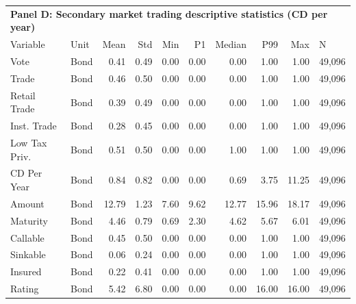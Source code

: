 \begin{table}[H]
\centering
\begin{tabular*}{\textwidth}{@{\extracolsep{\fill}}llrrrrrrrl}
\multicolumn{10}{l}{\textbf{Panel D: Secondary market trading descriptive statistics (CD per year)}}\\

\addlinespace
  \toprule
Variable & Unit & Mean & Std & Min & P1 & Median & P99 & Max & N \\ 
  \hline
Vote & Bond & 0.41 & 0.49 & 0.00 & 0.00 & 0.00 & 1.00 & 1.00 & 49,096 \\ 
  Trade & Bond & 0.46 & 0.50 & 0.00 & 0.00 & 0.00 & 1.00 & 1.00 & 49,096 \\ 
  Retail Trade & Bond & 0.39 & 0.49 & 0.00 & 0.00 & 0.00 & 1.00 & 1.00 & 49,096 \\ 
  Inst. Trade & Bond & 0.28 & 0.45 & 0.00 & 0.00 & 0.00 & 1.00 & 1.00 & 49,096 \\ 
  Low Tax Priv. & Bond & 0.51 & 0.50 & 0.00 & 0.00 & 1.00 & 1.00 & 1.00 & 49,096 \\ 
  CD Per Year & Bond & 0.84 & 0.82 & 0.00 & 0.00 & 0.69 & 3.75 & 11.25 & 49,096 \\ 
  Amount & Bond & 12.79 & 1.23 & 7.60 & 9.62 & 12.77 & 15.96 & 18.17 & 49,096 \\ 
  Maturity & Bond & 4.46 & 0.79 & 0.69 & 2.30 & 4.62 & 5.67 & 6.01 & 49,096 \\ 
  Callable & Bond & 0.45 & 0.50 & 0.00 & 0.00 & 0.00 & 1.00 & 1.00 & 49,096 \\ 
  Sinkable & Bond & 0.06 & 0.24 & 0.00 & 0.00 & 0.00 & 1.00 & 1.00 & 49,096 \\ 
  Insured & Bond & 0.22 & 0.41 & 0.00 & 0.00 & 0.00 & 1.00 & 1.00 & 49,096 \\ 
  Rating & Bond & 5.42 & 6.80 & 0.00 & 0.00 & 0.00 & 16.00 & 16.00 & 49,096 \\ 
   \hline
\end{tabular*}
\end{table}
